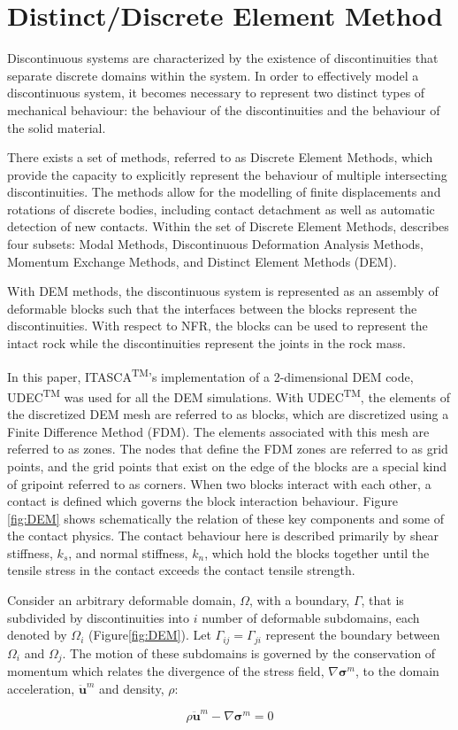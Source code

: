 \section{Distinct/Discrete Element Method}
Discontinuous systems are characterized by the existence of discontinuities that separate discrete domains within the system. In order to effectively model a discontinuous system, it becomes necessary to represent two distinct types of mechanical behaviour: the behaviour of the discontinuities and the behaviour of the solid material.

There exists a set of methods, referred to as Discrete Element Methods, which provide the capacity to explicitly represent the behaviour of multiple intersecting discontinuities. The methods allow for the modelling of finite displacements and rotations of discrete bodies, including contact detachment as well as automatic detection of new contacts. Within the set of Discrete Element Methods, \citet{CUNDALL_1992} describes four subsets: Modal Methods, Discontinuous Deformation Analysis Methods, Momentum Exchange Methods, and Distinct Element Methods (DEM).


With DEM methods, the discontinuous system is represented as an assembly of deformable blocks such that the interfaces between the blocks represent the discontinuities. With respect to NFR, the blocks can be used to represent the intact rock while the discontinuities represent the joints in the rock mass. 

In this paper, ITASCA\textsuperscript{TM}'s implementation of a 2-dimensional DEM code, UDEC\textsuperscript{TM} was used for all the DEM simulations. With UDEC\textsuperscript{TM}, the elements of the discretized DEM mesh are referred to as blocks, which are discretized using a Finite Difference Method (FDM). The elements associated with this mesh are referred to as zones. The nodes that define the FDM zones are referred to as grid points, and the grid points that exist on the edge of the blocks are a special kind of gripoint referred to as corners. When two blocks interact with each other, a contact is defined which governs the block interaction behaviour.  Figure \ref{fig:DEM} shows schematically the relation of these key components and some of the contact physics. The contact behaviour here is described primarily by shear stiffness, $k_s$, and normal stiffness, $k_n$, which hold the blocks together until the tensile stress in the contact exceeds the contact tensile strength. 

Consider an arbitrary deformable domain, $\Omega$, with a boundary, $\Gamma$, that is subdivided by discontinuities into $i$ number of deformable subdomains, each denoted by $\Omega_i$ (Figure\ref{fig:DEM}). Let $\Gamma_{ij}=\Gamma_{ji}$ represent the boundary between $\Omega_i$ and $\Omega_j$. The motion of these subdomains is governed by the conservation of momentum which relates the divergence of the stress field, $\nabla\boldsymbol{\sigma}^m$, to the domain acceleration, $\ddot{\mathbf{u}}^m$ and density, $\rho$:

\begin{equation}
\rho \ddot{\mathbf{u}}^m-\nabla\boldsymbol{\sigma}^m=0
\label{eqn:cauchy}
\end{equation}

